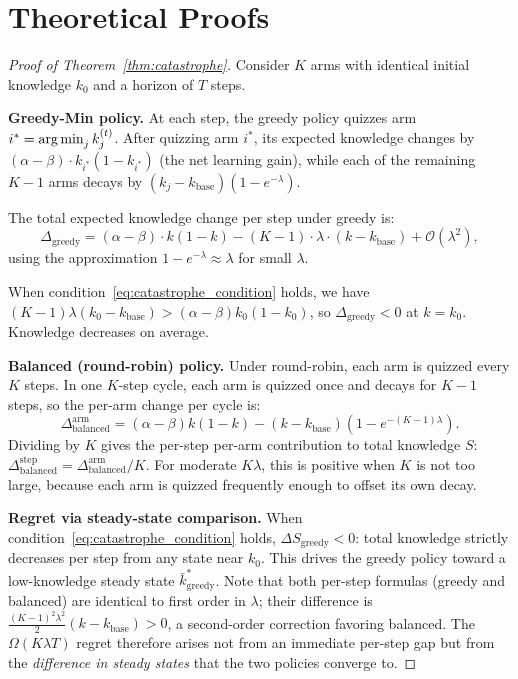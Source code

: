 \section{Theoretical Proofs}
\label{app:proofs}

\begin{proof}[Proof of Theorem~\ref{thm:catastrophe}]
Consider $K$ arms with identical initial knowledge $k_0$ and a horizon of $T$ steps.

\textbf{Greedy-Min policy.}
At each step, the greedy policy quizzes arm $i^* = \operatorname*{arg\,min}_j k_j^{(t)}$.
After quizzing arm $i^*$, its expected knowledge changes by $(\alpha - \beta) \cdot k_{i^*} (1 - k_{i^*})$ (the net learning gain), while each of the remaining $K{-}1$ arms decays by $(k_j - k_{\mathrm{base}})(1 - e^{-\lambda})$.

The total expected knowledge change per step under greedy is:
\[
\Delta_{\mathrm{greedy}} = (\alpha - \beta) \cdot k(1-k) - (K-1) \cdot \lambda \cdot (k - k_{\mathrm{base}}) + \mathcal{O}(\lambda^2),
\]
using the approximation $1 - e^{-\lambda} \approx \lambda$ for small $\lambda$.

When condition~\eqref{eq:catastrophe_condition} holds, we have $(K{-}1)\lambda(k_0 - k_{\mathrm{base}}) > (\alpha - \beta) k_0(1-k_0)$, so $\Delta_{\mathrm{greedy}} < 0$ at $k = k_0$. Knowledge decreases on average.

\textbf{Balanced (round-robin) policy.}
Under round-robin, each arm is quizzed every $K$ steps.
In one $K$-step cycle, each arm is quizzed once and decays for $K{-}1$ steps, so the per-arm change per cycle is:
\[
\Delta_{\mathrm{balanced}}^{\mathrm{arm}} = (\alpha - \beta) k(1-k) - (k - k_{\mathrm{base}})(1 - e^{-(K-1)\lambda}).
\]
Dividing by $K$ gives the per-step per-arm contribution to total knowledge $S$:
$\Delta_{\mathrm{balanced}}^{\mathrm{step}} = \Delta_{\mathrm{balanced}}^{\mathrm{arm}} / K$.
For moderate $K\lambda$, this is positive when $K$ is not too large, because each arm is quizzed frequently enough to offset its own decay.

\textbf{Regret via steady-state comparison.}
When condition~\eqref{eq:catastrophe_condition} holds, $\Delta S_{\mathrm{greedy}} < 0$: total knowledge strictly decreases per step from any state near $k_0$.
This drives the greedy policy toward a low-knowledge steady state $\bar{k}_{\mathrm{greedy}}^*$.
Note that both per-step formulas (greedy and balanced) are identical to first order in $\lambda$; their difference is $\frac{(K-1)^2\lambda^2}{2}(k-k_{\mathrm{base}}) > 0$, a second-order correction favoring balanced.
The $\Omega(K\lambda T)$ regret therefore arises not from an immediate per-step gap but from the \emph{difference in steady states} that the two policies converge to.


\end{proof}
